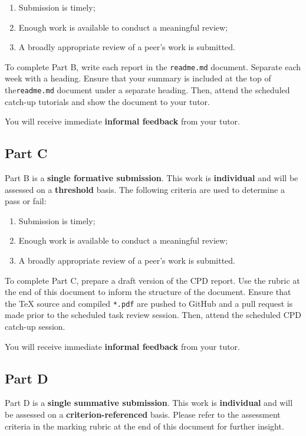 \documentclass{../../fal_assignment}
\begin{document}
\begin{enumerate}[label=(\alph*)]
	\item Submission is timely;
	\item Enough work is available to conduct a meaningful review;
	\item A broadly appropriate review of a peer's work is submitted.
\end{enumerate}

To complete Part B, write each report in the \texttt{readme.md} document. Separate each week with a heading. Ensure that your summary is included at the top of the\texttt{readme.md} document under a separate heading. Then, attend the scheduled catch-up tutorials and show the document to your tutor. 

You will receive immediate \textbf{informal feedback} from your tutor.

\subsection*{Part C}

Part B is a \textbf{single formative submission}. This work is \textbf{individual} and will be assessed on a \textbf{threshold} basis. The following criteria are used to determine a pass or fail:

\begin{enumerate}[label=(\alph*)]
	\item Submission is timely;
	\item Enough work is available to conduct a meaningful review;
	\item A broadly appropriate review of a peer's work is submitted.
\end{enumerate}

To complete Part C, prepare a draft version of the CPD report. Use the rubric at the end of this document to inform the structure of the document. Ensure that the TeX source and compiled \texttt{*.pdf} are pushed to GitHub and a pull request is made prior to the scheduled task review session. Then, attend the scheduled CPD catch-up session.

You will receive immediate \textbf{informal feedback} from your tutor.

\subsection*{Part D}

Part D is a \textbf{single summative submission}. This work is \textbf{individual} and will be assessed on a \textbf{criterion-referenced} basis. Please refer to the assessment criteria in the marking rubric at the end of this document for further insight.
\end{document}
